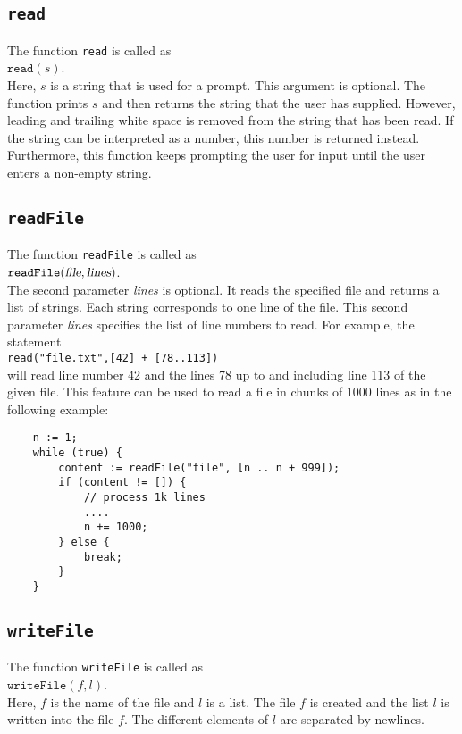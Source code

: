 \subsection{\texttt{read}}
The function \texttt{read}  is called as
\\[0.2cm]
\hspace*{1.3cm}
$\mathtt{read}(s)$.
\\[0.2cm]
Here, $s$ is a string that is used for a prompt.  This argument is optional. The function
prints $s$ and then 
returns the string that the user has supplied.  However, leading and trailing white space 
is removed from the string that has been read.  If the string can be interpreted as a
number, this number is returned instead.  Furthermore, this function keeps prompting the
user for input until the user enters a non-empty string.

\subsection{\texttt{readFile}}
The function \texttt{readFile}  is called as
\\[0.2cm]
\hspace*{1.3cm}
$\mathtt{readFile}(\textsl{file}, \textsl{lines})$.
\\[0.2cm]
The second parameter \textsl{lines} is optional.
It reads the specified file and returns a list of strings.  Each string corresponds to one
line of the file.   This second parameter \textsl{lines} specifies the list of line
numbers to read.  For example,  the statement 
\\[0.2cm]
\hspace*{1.3cm}
\texttt{read("file.txt",[42] + [78..113])}
\\[0.2cm]
will read line number 42 and the lines 78 up to and including line 113 of the given file.
This feature can be used to read a file in chunks of 1000 lines as in the following example:
\begin{verbatim}
    n := 1;
    while (true) {
        content := readFile("file", [n .. n + 999]);
        if (content != []) {
            // process 1k lines
            ....
            n += 1000;
        } else {
            break;
        }
    }
\end{verbatim}

\subsection{\texttt{writeFile}}
The function \texttt{writeFile}  is called as
\\[0.2cm]
\hspace*{1.3cm}
$\mathtt{writeFile}(f, l)$.
\\[0.2cm]
Here, $f$ is the name of the file and $l$ is a list.  The file $f$ is created and the list
$l$ is written into the file $f$.  The different elements of $l$ are separated by newlines.

